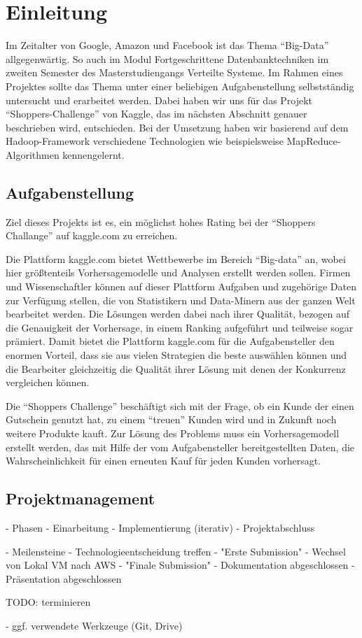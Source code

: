 \section{Einleitung}
Im Zeitalter von Google, Amazon und Facebook ist das Thema "`Big-Data"' allgegenwärtig. So auch im Modul Fortgeschrittene Datenbanktechniken im zweiten Semester des Masterstudiengangs Verteilte Systeme. Im Rahmen eines Projektes sollte das Thema unter einer beliebigen Aufgabenstellung selbstständig untersucht und erarbeitet werden. Dabei haben wir uns für das Projekt "`Shoppers-Challenge"' von Kaggle, das im nächsten Abschnitt genauer beschrieben wird, entschieden. Bei der Umsetzung haben wir basierend auf dem Hadoop-Framework verschiedene Technologien wie beispielsweise MapReduce-Algorithmen kennengelernt.

\subsection{Aufgabenstellung}
Ziel dieses Projekts ist es, ein möglichst hohes Rating bei der "`Shoppers Challange"' auf kaggle.com zu erreichen.

Die Plattform kaggle.com bietet Wettbewerbe im Bereich "`Big-data"' an, wobei hier größtenteils Vorhersagemodelle und Analysen erstellt werden sollen. Firmen und Wissenschaftler können auf dieser Plattform Aufgaben und zugehörige Daten zur Verfügung stellen, die von Statistikern und Data-Minern aus der ganzen Welt bearbeitet werden. Die Lösungen werden dabei nach ihrer Qualität, bezogen auf die Genauigkeit der Vorhersage, in einem Ranking aufgeführt und teilweise sogar prämiert. Damit bietet die Plattform kaggle.com für die Aufgabensteller den enormen Vorteil, dass sie aus vielen Strategien die beste auswählen können und die Bearbeiter gleichzeitig die Qualität ihrer Lösung mit denen der Konkurrenz vergleichen können.

Die "`Shoppers Challenge"' beschäftigt sich mit der Frage, ob ein Kunde der einen Gutschein genutzt hat, zu einem "`treuen"' Kunden wird und in Zukunft noch weitere Produkte kauft. Zur Lösung des Problems muss ein Vorhersagemodell erstellt werden, das mit Hilfe der vom Aufgabensteller bereitgestellten Daten, die Wahrscheinlichkeit für einen erneuten Kauf für jeden Kunden vorhersagt. 

\subsection{Projektmanagement}
- Phasen
	- Einarbeitung
	- Implementierung (iterativ)
	- Projektabschluss
	
- Meilensteine
	- Technologieentscheidung treffen
	- "Erste Submission"
	- Wechsel von Lokal VM nach AWS
	- "Finale Submission" 
	- Dokumentation abgeschlossen
	- Präsentation abgeschlossen
	
	TODO: terminieren
	
- ggf. verwendete Werkzeuge (Git, Drive)





